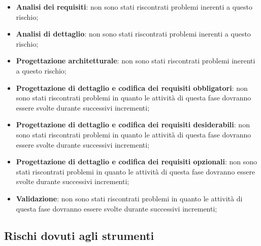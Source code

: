 			\begin{itemize}
				\item \textbf{Analisi dei requisiti}: non sono stati riscontrati problemi inerenti a questo rischio;
				\item \textbf{Analisi di dettaglio}: non sono stati riscontrati problemi inerenti a questo rischio;
				\item \textbf{Progettazione architetturale}: non sono stati riscontrati problemi inerenti a questo rischio;
				\item \textbf{Progettazione di dettaglio e codifica dei requisiti obbligatori}: non sono stati riscontrati problemi in quanto le attività di questa fase dovranno essere svolte durante successivi incrementi;
				\item \textbf{Progettazione di dettaglio e codifica dei requisiti desiderabili}: non sono stati riscontrati problemi in quanto le attività di questa fase dovranno essere svolte durante successivi incrementi;
				\item \textbf{Progettazione di dettaglio e codifica dei requisiti opzionali}: non sono stati riscontrati problemi in quanto le attività di questa fase dovranno essere svolte durante successivi incrementi;
				\item \textbf{Validazione}: non sono stati riscontrati problemi in quanto le attività di questa fase dovranno essere svolte durante successivi incrementi;
			\end{itemize}



	\subsection{Rischi dovuti agli strumenti} %
	\label{sub:rischi_dovuti_agli_strumenti}
